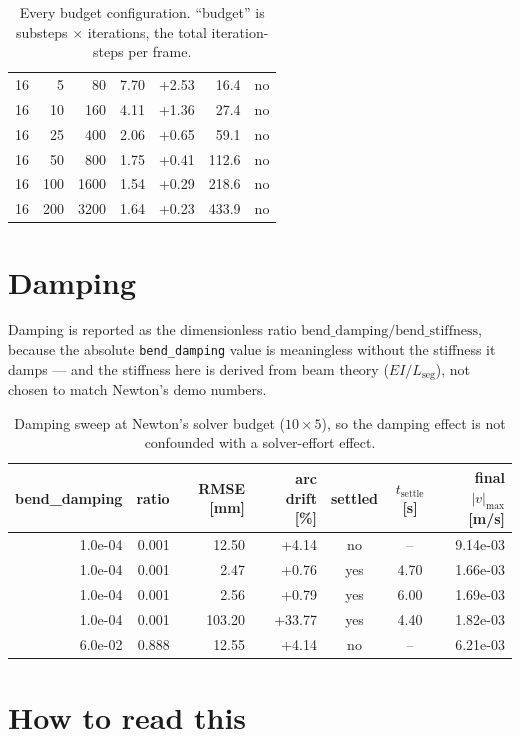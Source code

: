 \documentclass[11pt,a4paper]{article}
\begin{document}
\begin{table}[htbp]
\begin{tabular}{rrrrrrc}
    16 & 5 & 80 & 7.70 & +2.53 & 16.4 & no \\
    16 & 10 & 160 & 4.11 & +1.36 & 27.4 & no \\
    16 & 25 & 400 & 2.06 & +0.65 & 59.1 & no \\
    16 & 50 & 800 & 1.75 & +0.41 & 112.6 & no \\
    16 & 100 & 1600 & 1.54 & +0.29 & 218.6 & no \\
    16 & 200 & 3200 & 1.64 & +0.23 & 433.9 & no \\
\bottomrule
\end{tabular}
\caption{Every budget configuration. ``budget'' is
substeps $\times$ iterations, the total iteration-steps per frame.}
\end{table}

\section{Damping}

Damping is reported as the dimensionless ratio
$\text{bend\_damping}/\text{bend\_stiffness}$, because the absolute
\texttt{bend\_damping} value is meaningless without the stiffness it damps ---
and the stiffness here is derived from beam theory ($EI/L_{\text{seg}}$),
not chosen to match Newton's demo numbers.

\begin{table}[htbp]
\centering
\small
\begin{tabular}{rrrrccr}
\toprule
bend\_damping & ratio & RMSE [mm] & arc drift [\%] & settled & $t_{\text{settle}}$ [s] & final $|v|_{\max}$ [m/s] \\
\midrule
    1.0e-04 & 0.001 & 12.50 & +4.14 & no & -- & 9.14e-03 \\
    1.0e-04 & 0.001 & 2.47 & +0.76 & yes & 4.70 & 1.66e-03 \\
    1.0e-04 & 0.001 & 2.56 & +0.79 & yes & 6.00 & 1.69e-03 \\
    1.0e-04 & 0.001 & 103.20 & +33.77 & yes & 4.40 & 1.82e-03 \\
    6.0e-02 & 0.888 & 12.55 & +4.14 & no & -- & 6.21e-03 \\
\bottomrule
\end{tabular}
\caption{Damping sweep at Newton's solver budget ($10\times5$), so the damping
effect is not confounded with a solver-effort effect.}
\end{table}

\section{How to read this}
\end{document}
